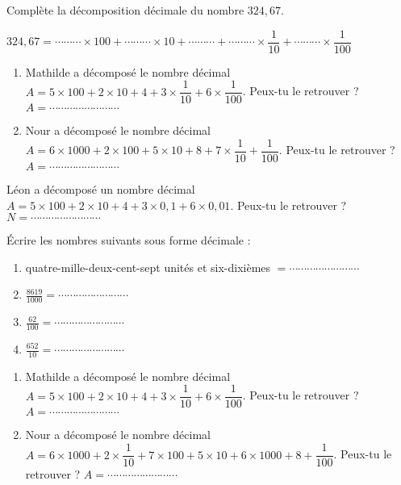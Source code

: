 Complète la décomposition décimale du nombre $324,67$.

$324,67 = \cdots\cdots\cdots  \times 100 + \cdots\cdots\cdots \times 10 + \cdots\cdots\cdots  + \cdots\cdots\cdots \times \dfrac{1}{10} + \cdots\cdots\cdots \times \dfrac{1}{100} $




\begin{enumerate}


\item Mathilde a décomposé le nombre décimal  $A = 5\times 100 + 2\times 10 + 4 + 3\times \dfrac{1}{10} +  6\times \dfrac{1}{100} $. Peux-tu le retrouver ?
$A = \cdots\cdots\cdots\cdots\cdots\cdots\cdots\cdots $

\item Nour a décomposé le nombre décimal  $A = 6\times 1000 + 2\times 100 + 5\times 10 + 8 + 7\times \dfrac{1}{10} +   \dfrac{1}{100} $. Peux-tu le retrouver ?
$A = \cdots\cdots\cdots\cdots\cdots\cdots\cdots\cdots $
\end{enumerate}



Léon a décomposé un nombre décimal  $A = 5\times 100 + 2\times 10 + 4 + 3\times 0,1 +  6\times 0,01 $. Peux-tu le retrouver ?
$N = \cdots\cdots\cdots\cdots\cdots\cdots\cdots\cdots $




Écrire les nombres suivants sous forme décimale :
\begin{enumerate}
\item quatre-mille-deux-cent-sept unités et six-dixièmes $= \cdots\cdots\cdots\cdots\cdots\cdots\cdots\cdots $
\item $\frac{8619}{1000}= \cdots\cdots\cdots\cdots\cdots\cdots\cdots\cdots$
\item $\frac{62}{100}= \cdots\cdots\cdots\cdots\cdots\cdots\cdots\cdots$
\item $\frac{652}{10}= \cdots\cdots\cdots\cdots\cdots\cdots\cdots\cdots$
\end{enumerate}
 


\begin{enumerate}
\item Mathilde a décomposé le nombre décimal  $A = 5\times 100 + 2\times 10 + 4 + 3\times \dfrac{1}{10} +  6\times \dfrac{1}{100} $. Peux-tu le retrouver ?
$A = \cdots\cdots\cdots\cdots\cdots\cdots\cdots\cdots $

\item Nour a décomposé le nombre décimal  $A = 6\times 1000 + 2\times \dfrac{1}{10} +  7\times 100 + 5\times 10 + 6\times 1000 + 8 +   \dfrac{1}{100} $. Peux-tu le retrouver ?
$A = \cdots\cdots\cdots\cdots\cdots\cdots\cdots\cdots $
\end{enumerate}


